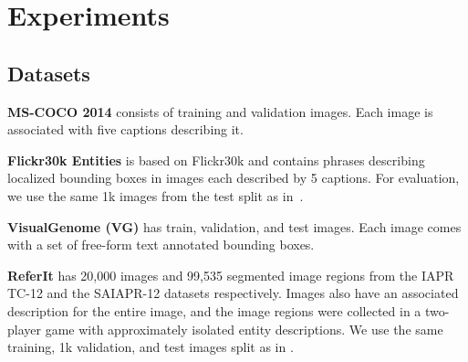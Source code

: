 \documentclass[10pt,twocolumn,letterpaper]{article}
\newcommand\secvspace{\vspace{-0.0cm}}
\begin{document}
\section{Experiments}\label{sec:experiments}
\secvspace
\subsection{Datasets}\label{sec:datasets}
\secvspace
\noindent\textbf{MS-COCO 2014} \cite{lin2014microsoft} consists of  training and  validation images. Each image is associated
with five captions describing it.

\noindent\textbf{Flickr30k Entities} \cite{plummer2015flickr30k} is based on Flickr30k \cite{young2014image} and contains  phrases describing localized bounding boxes in  images each described by 5 captions. 
For evaluation, we use the same 1k images from the test split as in~\cite{akbari2019multi}.

\noindent\textbf{VisualGenome (VG)} \cite{krishna2017visual} has  train,  validation, and  test images. Each image comes with a set of free-form text annotated bounding boxes.

\noindent\textbf{ReferIt} has 20,000 images and 99,535 segmented image regions from the IAPR TC-12 \cite{grubinger2006iapr} and the SAIAPR-12 datasets \cite{chen2017query} respectively. Images also have an associated description for the entire image, and the image regions were collected in a two-player game \cite{kazemzadeh2014referitgame} with approximately  isolated entity descriptions. We use the same  training, 1k validation, and  test images split as in \cite{akbari2019multi}. \secvspace
\end{document}
